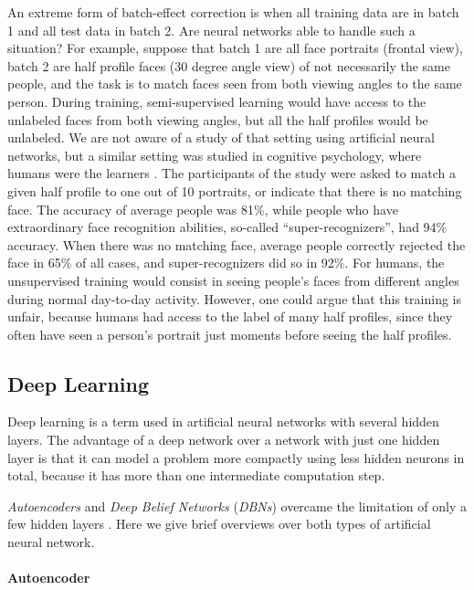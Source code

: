An extreme form of batch-effect correction is when all training data
are in batch 1 and all test data in batch 2. Are neural networks able
to handle such a situation? For example, suppose that batch 1 are
all face portraits (frontal view), batch 2 are half profile faces
(30 degree angle view) of \textendash{} not necessarily the same \textendash{}
people, and the task is to match faces seen from both viewing angles
to the same person. During training, semi-supervised learning would
have access to the unlabeled faces from both viewing angles, but all
the half profiles would be unlabeled. We are not aware of a study
of that setting using artificial neural networks, but a similar setting
was studied in cognitive psychology, where humans were the learners
\cite{BobakBate2015}. The participants of the study were asked to
match a given half profile to one out of 10 portraits, or indicate
that there is no matching face. The accuracy of average people was
81\%, while people who have extraordinary face recognition abilities,
so-called ``super-recognizers'', had 94\% accuracy. When there was
no matching face, average people correctly rejected the face in 65\%
of all cases, and super-recognizers did so in 92\%. For humans, the
unsupervised training would consist in seeing people's faces from
different angles during normal day-to-day activity. However, one could
argue that this training is unfair, because humans had access to the
label of many half profiles, since they often have seen a person's
portrait just moments before seeing the half profiles.

\subsection{Deep Learning}

Deep learning is a term used in artificial neural
networks with several hidden layers. The advantage of a deep network
over a network with just one hidden layer is that it can model a problem
more compactly using less hidden neurons in total, because it has
more than one intermediate computation step.

\emph{Autoencoders} and \emph{Deep Belief Networks}\emph{
}(\emph{DBNs}) overcame the limitation of only a few hidden
layers \cite{BengioLarochelle2007,HintonTeh2006}. Here we give brief
overviews over both types of artificial neural network.

\paragraph{Autoencoder}

